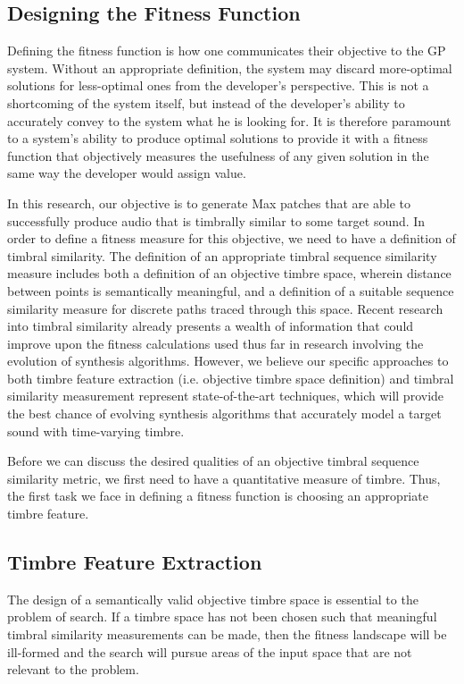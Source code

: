 \documentclass[12pt]{report} 	%
\numberwithin{figure}{chapter}
\numberwithin{table}{chapter}
\numberwithin{equation}{chapter}
\begin{document}
\begin{flushleft}
\section{Designing the Fitness Function}

Defining the fitness function is how one communicates their objective to the GP system. Without an appropriate definition, the system may discard more-optimal solutions for less-optimal ones from the developer's perspective. This is not a shortcoming of the system itself, but instead of the developer's ability to accurately convey to the system what he is looking for. It is therefore paramount to a system's ability to produce optimal solutions to provide it with a fitness function that objectively measures the usefulness of any given solution in the same way the developer would assign value.

In this research, our objective is to generate Max patches that are able to successfully produce audio that is timbrally similar to some target sound. In order to define a fitness measure for this objective, we need to have a definition of timbral similarity. The definition of an appropriate timbral sequence similarity measure includes both a definition of an objective timbre space, wherein distance between points is semantically meaningful, and a definition of a suitable sequence similarity measure for discrete paths traced through this space. Recent research into timbral similarity already presents a wealth of information that could improve upon the fitness calculations used thus far in research involving the evolution of synthesis algorithms. However, we believe our specific approaches to both timbre feature extraction (i.e. objective timbre space definition) and timbral similarity measurement represent state-of-the-art techniques, which will provide the best chance of evolving synthesis algorithms that accurately model a target sound with time-varying timbre.

Before we can discuss the desired qualities of an objective timbral sequence similarity metric, we first need to have a quantitative measure of timbre. Thus, the first task we face in defining a fitness function is choosing an appropriate timbre feature.

\subsection{Timbre Feature Extraction}

The design of a semantically valid objective timbre space is essential to the problem of search. If a timbre space has not been chosen such that meaningful timbral similarity measurements can be made, then the fitness landscape will be ill-formed and the search will pursue areas of the input space that are not relevant to the problem.


\end{flushleft}
\end{document}
